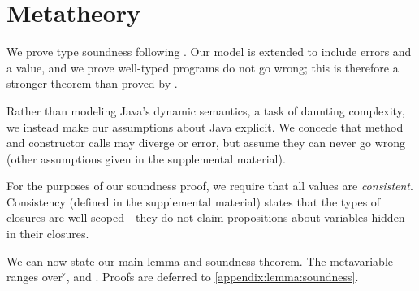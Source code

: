 \section{Metatheory}
\label{sec:metatheory}

We prove type soundness following \cite{TF10}.  Our model is extended
to include errors and a \wrong{} value, and we prove well-typed
programs do not go wrong; this is therefore a stronger theorem than
proved by \cite{TF10}.

Rather than modeling Java's dynamic semantics, a task of daunting
complexity, we instead make our assumptions about Java explicit. We
concede that method and constructor calls may diverge or error, but
assume they can never go wrong
(other assumptions
given in the supplemental material).

{}





For the purposes of our soundness proof, we require that all values
are \emph{consistent}.  Consistency (defined in the supplemental
material) states that the types of closures are well-scoped---they do
not claim propositions about variables hidden in their closures.


We can now state our main lemma and soundness theorem.  The
metavariable  ranges over \v{}, \errorvalv{} and
\wrong{}. Proofs are deferred to \ref{appendix:lemma:soundness}.

\begin{lemma}\label{main:lemma:soundness}

  {\soundnesslemmahypothesis}
\end{lemma}



{}

%
